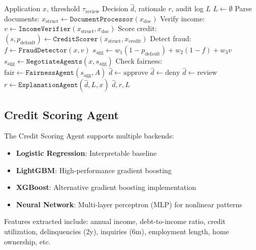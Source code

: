 \documentclass[11pt]{article}
\begin{document}
\begin{algorithm}
\caption{Loan Supervisor Orchestration}
\label{alg:supervisor}
\begin{algorithmic}[1]
\REQUIRE Application $x$, threshold $\tau_{\text{review}}$
\ENSURE Decision $\hat{d}$, rationale $r$, audit log $L$
\STATE $L \leftarrow \emptyset$ 
\STATE Parse documents: $x_{\text{struct}} \leftarrow \texttt{DocumentProcessor}(x_{\text{doc}})$
\STATE Verify income: $v \leftarrow \texttt{IncomeVerifier}(x_{\text{struct}}, x_{\text{doc}})$
\STATE Score credit: $(s, p_{\text{default}}) \leftarrow \texttt{CreditScorer}(x_{\text{struct}}, x_{\text{credit}})$
\STATE Detect fraud: $f \leftarrow \texttt{FraudDetector}(x, v)$
\STATE $s_{\text{agg}} \leftarrow w_1 (1 - p_{\text{default}}) + w_2 (1 - f) + w_3 v$ 
 
    \STATE $s_{\text{agg}} \leftarrow \texttt{NegotiateAgents}(x, s_{\text{agg}})$ 
\ENDIF
\STATE Check fairness: $\text{fair} \leftarrow \texttt{FairnessAgent}(s_{\text{agg}}, A)$
    \STATE $\hat{d} \leftarrow \text{approve}$
    \STATE $\hat{d} \leftarrow \text{deny}$
\ELSE
    \STATE $\hat{d} \leftarrow \text{review}$ 
\ENDIF
\STATE $r \leftarrow \texttt{ExplanationAgent}(\hat{d}, L, x)$
\RETURN $\hat{d}, r, L$
\end{algorithmic}
\end{algorithm}

\subsection{Credit Scoring Agent}

The Credit Scoring Agent supports multiple backends:
\begin{itemize}
    \item \textbf{Logistic Regression}: Interpretable baseline
    \item \textbf{LightGBM}: High-performance gradient boosting
    \item \textbf{XGBoost}: Alternative gradient boosting implementation
    \item \textbf{Neural Network}: Multi-layer perceptron (MLP) for nonlinear patterns
\end{itemize}

Features extracted include: annual income, debt-to-income ratio, credit utilization, delinquencies (2y), inquiries (6m), employment length, home ownership, etc.
\end{document}
